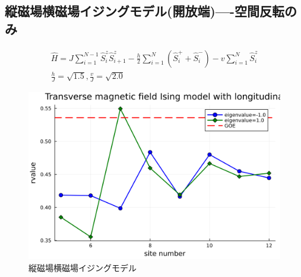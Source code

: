 \documentclass{ltjsarticle}
\begin{document}
\subsection*{縦磁場横磁場イジングモデル(開放端)—-空間反転のみ}
\begin{gather}
  \hat{H}=J\sum_{i=1}^{N-1} \hat{S}_i^z\hat{S}_{i+1}^z - \frac{h}{2}\sum_{i=1}^{N} \left( \hat{S}_i^+ + \hat{S}_i^- \right) - v\sum_{i=1}^{N} \hat{S}_i^z\\
  \frac{h}{J}=\sqrt{1.5},\frac{v}{J}=\sqrt{2.0}
\end{gather}
\begin{figure}[H]
  \centering
  \includegraphics[width=150mm]{rvalue_transverse.png}
  \caption{縦磁場横磁場イジングモデル}
  \label{fig:rvalue_transverse}
\end{figure}
\end{document}
